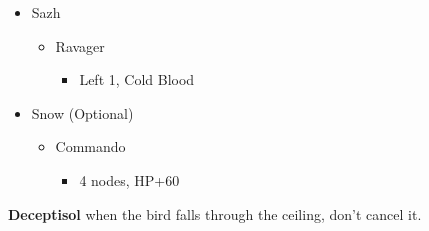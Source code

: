 \begin{menu}
	\begin{itemize}
		\crystarium
		\begin{itemize}
			\item Sazh
			      \begin{itemize}
				      \item Ravager
				            \begin{itemize}
					            \item Left 1, Cold Blood
				            \end{itemize}
			      \end{itemize}
			\item Snow (Optional)
			      \begin{itemize}
				      \item Commando
				            \begin{itemize}
					            \item 4 nodes, HP+60
				            \end{itemize}
			      \end{itemize}
		\end{itemize}
	\end{itemize}
\end{menu}

\textbf{Deceptisol} when the bird falls through the ceiling, don't cancel it.

